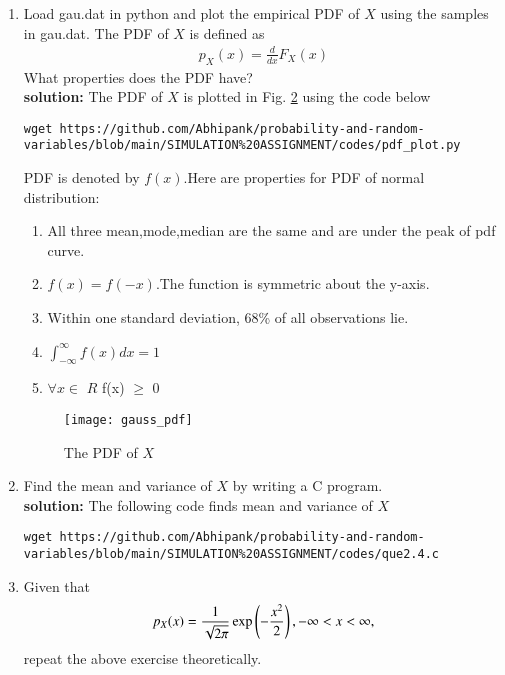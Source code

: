 \documentclass[journal,12pt,twocolumn]{IEEEtran}
\renewcommand\thesection{\arabic{section}}
\begin{document}
\begin{enumerate}[label=\thesection.\arabic*
,ref=\thesection.\theenumi]
\begin{figure}
\centering
\texttt{[image: gauss\_cdf]}
\caption{The CDF of $X$}
\label{fig:gauss_cdf}
\end{figure}
\item
Load gau.dat in python and plot the empirical PDF of $X$ using the samples in gau.dat. The PDF of $X$ is defined as
\begin{align}
p_{X}(x) = \frac{d}{dx}F_{X}(x)
\end{align}
What properties does the PDF have?
\\
\textbf{solution:} The PDF of $X$ is plotted in Fig. \ref{fig:gauss_pdf} using the code below
\begin{lstlisting}
wget https://github.com/Abhipank/probability-and-random-variables/blob/main/SIMULATION%20ASSIGNMENT/codes/pdf_plot.py
\end{lstlisting}
PDF is denoted by $f(x)$.Here are  properties for PDF of normal distribution:
\begin{enumerate}
\item
    All three mean,mode,median are the same and are under the peak of pdf curve.
\item
    $f(x)=f(-x)$.The function is symmetric about the y-axis.
\item
    Within one standard deviation, 68\% of all observations lie.
\item
    $\int_{-\infty}^{\infty}f(x)dx=1$
\item
  $\forall x \in$ $R$ f(x) $\geq$ 0
\end{enumerate}
\begin{figure}
\centering
\texttt{[image: gauss\_pdf]}
\caption{The PDF of $X$}
\label{fig:gauss_pdf}
\end{figure}
\item Find the mean and variance of $X$ by writing a C program.\\
\textbf{solution:}  The following code finds mean and variance of $X$ 
\begin{lstlisting}
wget https://github.com/Abhipank/probability-and-random-variables/blob/main/SIMULATION%20ASSIGNMENT/codes/que2.4.c
\end{lstlisting}
\item Given that 
\begin{align}
p_{X}(x) = \frac{1}{\sqrt{2\pi}}\exp\left(-\frac{x^2}{2}\right), -\infty < x < \infty,
\end{align}
repeat the above exercise theoretically.
%
\end{enumerate}
\end{document}
